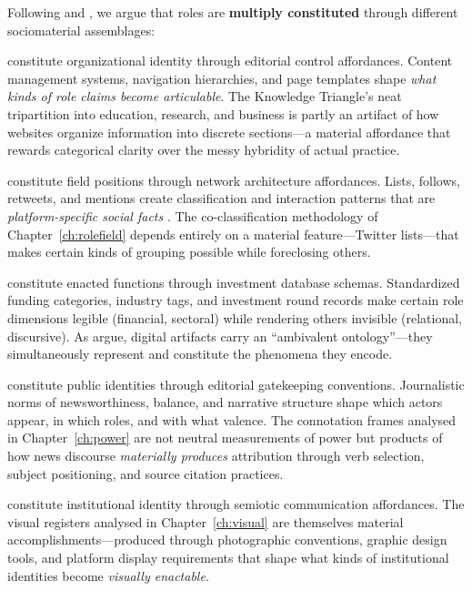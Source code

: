 \documentclass[../main.tex]{subfiles}
\begin{document}
Following \textcite{orlikowski2008sociomateriality} and \textcite{leonardi2013theoretical}, we argue that roles are \textbf{multiply constituted} through different sociomaterial assemblages:

\begin{description}[leftmargin=0.5cm, itemsep=0.3em]
\item[Websites $\rightarrow$ Claimed roles] constitute organizational identity through editorial control affordances. Content management systems, navigation hierarchies, and page templates shape \emph{what kinds of role claims become articulable}. The Knowledge Triangle's neat tripartition into education, research, and business is partly an artifact of how websites organize information into discrete sections---a material affordance that rewards categorical clarity over the messy hybridity of actual practice.

\item[Twitter/X $\rightarrow$ Relational roles] constitute field positions through network architecture affordances. Lists, follows, retweets, and mentions create classification and interaction patterns that are \emph{platform-specific social facts} \cite{scott2014entanglements}. The co-classification methodology of Chapter~\ref{ch:rolefield} depends entirely on a material feature---Twitter lists---that makes certain kinds of grouping possible while foreclosing others.

\item[Crunchbase $\rightarrow$ Resourced roles] constitute enacted functions through investment database schemas. Standardized funding categories, industry tags, and investment round records make certain role dimensions legible (financial, sectoral) while rendering others invisible (relational, discursive). As \textcite{kallinikos2013ambivalent} argue, digital artifacts carry an ``ambivalent ontology''---they simultaneously represent and constitute the phenomena they encode.

\item[News media $\rightarrow$ Attributed roles] constitute public identities through editorial gatekeeping conventions. Journalistic norms of newsworthiness, balance, and narrative structure shape which actors appear, in which roles, and with what valence. The connotation frames analysed in Chapter~\ref{ch:power} are not neutral measurements of power but products of how news discourse \emph{materially produces} attribution through verb selection, subject positioning, and source citation practices.

\item[Visual materials $\rightarrow$ Embodied roles] constitute institutional identity through semiotic communication affordances. The visual registers analysed in Chapter~\ref{ch:visual} are themselves material accomplishments---produced through photographic conventions, graphic design tools, and platform display requirements that shape what kinds of institutional identities become \emph{visually enactable}.
\end{description}
\end{document}

